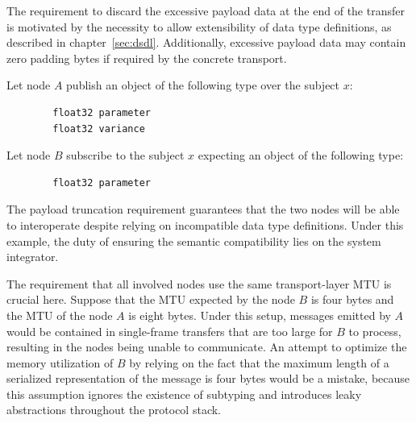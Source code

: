 \begin{remark}[breakable]
    The requirement to discard the excessive payload data at the end of the transfer is motivated by
    the necessity to allow extensibility of data type definitions, as described in chapter~\ref{sec:dsdl}.
    Additionally, excessive payload data may contain zero padding bytes if required by the concrete transport.

    Let node $A$ publish an object of the following type over the subject $x$:

    \begin{verbatim}
        float32 parameter
        float32 variance
    \end{verbatim}

    Let node $B$ subscribe to the subject $x$ expecting an object of the following type:

    \begin{verbatim}
        float32 parameter
    \end{verbatim}

    The payload truncation requirement guarantees that the two nodes will be able to interoperate despite
    relying on incompatible data type definitions.
    Under this example, the duty of ensuring the semantic compatibility lies on the system integrator.

    The requirement that all involved nodes use the same transport-layer MTU is crucial here.
    Suppose that the MTU expected by the node $B$ is four bytes and the MTU of the node $A$ is eight bytes.
    Under this setup, messages emitted by $A$ would be contained in single-frame transfers that are too large
    for $B$ to process, resulting in the nodes being unable to communicate.
    An attempt to optimize the memory utilization of $B$ by relying on the fact that the maximum length of a
    serialized representation of the message is four bytes would be a mistake, because this assumption ignores
    the existence of subtyping and introduces leaky abstractions throughout the protocol stack.
\end{remark}

